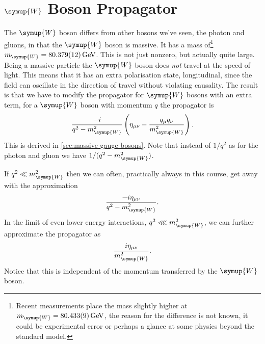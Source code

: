 \documentclass[fleqn]{NotesClass}
\newcommand{\Pparticle}[1]{\symup{#1}}
\newcommand{\PW}{\ensuremath{\Pparticle{W}}}
\newcommand{\minkowskiMetric}{\eta}
\begin{document}
    \section{\PW{} Boson Propagator}
    The \PW{} boson differs from other bosons we've seen, the photon and gluons, in that the \PW{} boson is massive.
    It has a mass of\footnote{Recent measurements place the mass slightly higher at \(m_{\PW} = \qty{80.433(9)}{\giga\electronvolt}\), the reason for the difference is not known, it could be experimental error or perhaps a glance at some physics beyond the standard model.} \(m_{\PW} = \qty{80.379(12)}{\giga\electronvolt}\).
    This is not just nonzero, but actually quite large.
    Being a massive particle the \PW{} boson does \emph{not} travel at the speed of light.
    This means that it has an extra polarisation state, longitudinal, since the field can oscillate in the direction of travel without violating causality.
    The result is that we have to modify the propagator for \PW{} bosons with an extra term, for a \PW{} boson with momentum \(q\) the propagator is
    \begin{equation}
        \frac{-i}{q^2 - m_{\PW}^2}\left( \minkowskiMetric_{\mu\nu} - \frac{q_\mu q_\nu}{m_{\PW}^2} \right).
    \end{equation}
    This is derived in \cref{sec:massive gauge bosons}.
    Note that instead of \(1/q^2\) as for the photon and gluon we have \(1/(q^2 - m_{\PW}^2)\).
    
    If \(q^2 \ll m_{\PW}^2\) then we can often, practically always in this course, get away with the approximation
    \begin{equation}
        \frac{-i\minkowskiMetric_{\mu\nu}}{q^2 - m_{\PW}^2}.
    \end{equation}
    In the limit of even lower energy interactions, \(q^2 \lll m_{\PW}^2\), we can further approximate the propagator as
    \begin{equation}
        \frac{i\minkowskiMetric_{\mu\nu}}{m_{\PW}^2}.
    \end{equation}
    Notice that this is independent of the momentum transferred by the \PW{} boson.
    
\end{document}
